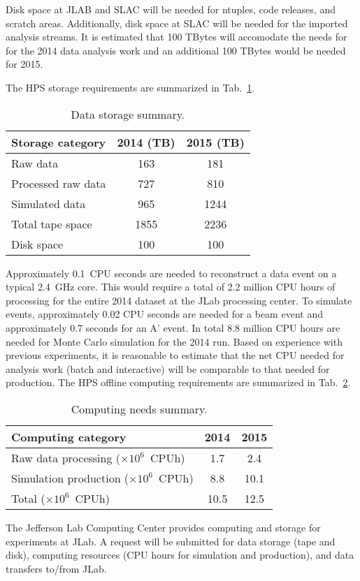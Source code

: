 Disk space at JLAB and SLAC will be 
needed for ntuples, code releases, and scratch areas. Additionally, disk space at SLAC will be needed for the imported analysis streams. It is estimated that
100 TBytes will accomodate the needs for for the 2014 data analysis work
and an additional 100 TBytes would be needed for 2015.

The HPS storage requirements are summarized in Tab.~\ref{tab:datastorage}.
\begin{table}[tbp]
\centering
\begin{tabular}{|l|c|c|}
\hline
Storage category & 2014 (TB) & 2015 (TB) \\
\hline
Raw data & 163 & 181 \\
Processed raw data & 727 & 810 \\
Simulated data & 965 & 1244 \\
\hline
Total tape space & 1855 & 2236 \\
\hline
Disk space  & 100  & 100 \\
\hline
\end{tabular}
\caption{{\small Data storage summary.}}
\label{tab:datastorage}
\end{table}

Approximately 0.1~CPU seconds are needed to reconstruct a data event on 
a typical 2.4~GHz core. This would require a total of 2.2 million CPU hours of processing for the 
entire 2014 dataset at the JLab processing center.  To simulate events, approximately 0.02 CPU seconds 
are needed for a beam event and approximately 0.7 seconds for an A' event. In total 8.8 million CPU hours are needed for Monte Carlo 
simulation for the 2014 run. 
Based on experience with previous experiments, it is reasonable to estimate that the net CPU needed for 
analysis work (batch and interactive) will be comparable to that needed for production. 
The HPS offline computing requirements 
are summarized in Tab.~\ref{tab:computing}.
\begin{table}[tbp]
\centering
\begin{tabular}{|l|c|c|}
\hline
Computing category & 2014& 2015 \\
\hline
Raw data processing ($\times 10^{6}$~CPUh)  & 1.7 & 2.4 \\
Simulation production ($\times 10^{6}$~CPUh) & 8.8 & 10.1 \\
\hline
Total ($\times 10^{6}$~CPUh) & 10.5 & 12.5 \\
\hline
\end{tabular}
\caption{{\small Computing needs summary.}}
\label{tab:computing}
\end{table}

The Jefferson Lab Computing Center provides computing and storage for experiments at JLab. 
A request will be submitted for data storage (tape and disk), computing resources (CPU hours for simulation and production), and data transfers to/from JLab.
